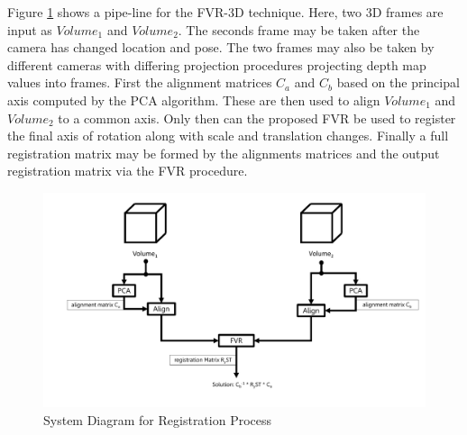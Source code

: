 Figure \ref{fig:PIPELINE8} shows a pipe-line for the FVR-3D technique. Here, two 3D frames are input as $Volume_1$ and $Volume_2$. The seconds frame may be taken after the camera has changed location and pose. The two frames may also be taken by different cameras with differing projection procedures projecting depth map values into frames. First the alignment matrices $C_a$ and $C_b$ based on the principal axis computed by the PCA algorithm. These are then used to align $Volume_1$ and $Volume_2$ to a common axis. Only then can the proposed FVR be used to register the final axis of rotation along with scale and translation changes. Finally a full registration matrix may be formed by the alignments matrices and the output registration matrix via the FVR procedure. \\

\begin{figure}[!htb]
\centering
\includegraphics[width=6.0in]{images/methodology/FVR/pipeline8}
\caption{System Diagram for Registration Process}
\label{fig:PIPELINE8}
\end{figure}






